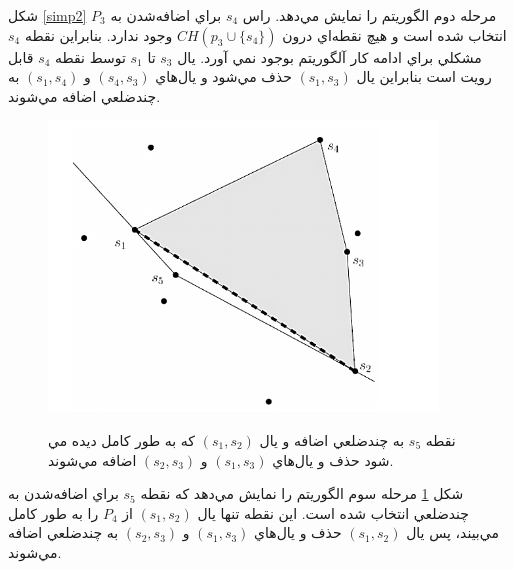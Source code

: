 \documentclass{book}
\begin{document}
شکل \ref{simp2} مرحله دوم الگوريتم را نمايش مي‌دهد. راس $s_4$ براي اضافه‌شدن به $P_3$ انتخاب‌ شده است و هيچ نقطه‌اي درون $CH(p_3 \cup \{s_4\})$ وجود ندارد. بنابراين نقطه $s_4$ مشکلي براي ادامه کار آلگوريتم بوجود نمي آورد. يال $s_3$ تا $s_1$ توسط نقطه $s_4$ قابل رويت است بنابراين يال $(s_1,s_3)$ حذف مي‌شود و يال‌هاي $(s_4,s_3)$ و $(s_1,s_4)$ به چندضلعي اضافه مي‌شوند.

\begin{figure}[h!]
    \begin{center}
        \includegraphics[width=\linewidth]{simp3.png}
        \label{simp3}
        \caption{نقطه $s_5$ به چندضلعي اضافه‌ و يال $(s_1,s_2)$ که به طور کامل ديده مي شود حذف و يال‌هاي $(s_1,s_3)$ و $(s_2,s_3)$ اضافه مي‌شوند.}
    \end{center}
\end{figure}

شکل \ref{simp3} مرحله سوم الگوريتم را نمايش مي‌دهد که نقطه $s_5$ براي اضافه‌شدن به چندضلعي انتخاب شده است. اين نقطه تنها يال $(s_1,s_2)$ از $P_4$ را به‌ طور کامل مي‌بيند، پس يال $(s_1,s_2)$ حذف و يال‌هاي $(s_1,s_3)$ و $(s_2,s_3)$ به چندضلعي اضافه مي‌شوند.
\end{document}
